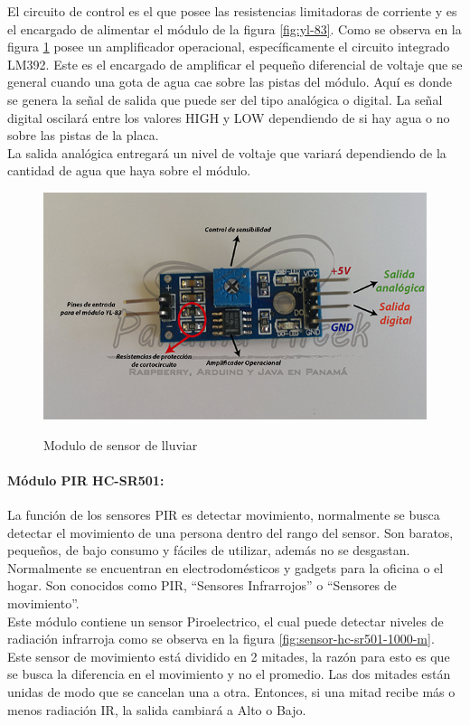 El circuito de control es el que posee las resistencias limitadoras de corriente y es el encargado de alimentar el módulo de la figura \ref{fig:yl-83}. Como se observa en la figura \ref{fig:yl-831} posee un amplificador operacional, específicamente el circuito integrado LM392. Este es el encargado de amplificar el pequeño diferencial de voltaje que se general cuando una gota de agua cae sobre las pistas del módulo. Aquí es donde se genera la señal de salida que puede ser del tipo analógica o digital. La señal digital oscilará entre los valores HIGH y LOW dependiendo de si hay agua o no sobre las pistas de la placa.\\

La salida analógica entregará un nivel de voltaje que variará dependiendo de la cantidad de agua que haya sobre el módulo.\cite{LLU}

\begin{figure}[H]
	\centering
	\caption{Modulo de sensor de lluviar \cite{LLU}}
	\includegraphics[width=0.5\linewidth]{Imagenes/YL-831}
	\label{fig:yl-831}
\end{figure}

\paragraph{Módulo PIR HC-SR501: }

La función de los sensores PIR es detectar movimiento, normalmente se busca detectar el movimiento de una persona dentro del rango del sensor. Son baratos, pequeños, de bajo consumo y fáciles de utilizar, además no se desgastan. Normalmente se encuentran en electrodomésticos y gadgets para la oficina o el hogar. Son conocidos como PIR, ``Sensores Infrarrojos'' o ``Sensores de movimiento''.\\

Este módulo contiene un sensor Piroelectrico, el cual puede detectar niveles de radiación infrarroja como se observa en la figura \ref{fig:sensor-hc-sr501-1000-m}. Este sensor de movimiento está dividido en 2 mitades, la razón para esto es que se busca la diferencia en el movimiento y no el promedio. Las dos mitades están unidas  de modo que se cancelan una a otra. Entonces, si una mitad recibe más o menos radiación IR, la salida cambiará a Alto o Bajo. \cite{PIR1}\\

